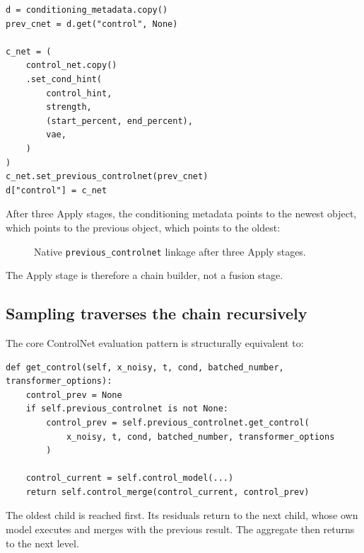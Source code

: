 \documentclass[11pt]{article}
\newcommand{\code}[1]{\texttt{#1}}
\begin{document}
\begin{lstlisting}[style=pythonstyle,caption={Native-style chain construction preserved by JLC Apply.}]
d = conditioning_metadata.copy()
prev_cnet = d.get("control", None)

c_net = (
    control_net.copy()
    .set_cond_hint(
        control_hint,
        strength,
        (start_percent, end_percent),
        vae,
    )
)
c_net.set_previous_controlnet(prev_cnet)
d["control"] = c_net
\end{lstlisting}

After three Apply stages, the conditioning metadata points to the newest object, which points to the previous object, which points to the oldest:

\begin{figure}[H]
\centering
{}
\caption{Native \code{previous\_controlnet} linkage after three Apply stages.}
\end{figure}

The Apply stage is therefore a chain builder, not a fusion stage.

\subsection{Sampling traverses the chain recursively}

The core ControlNet evaluation pattern is structurally equivalent to:

\begin{lstlisting}[style=pythonstyle,caption={Simplified native recursive evaluation.}]
def get_control(self, x_noisy, t, cond, batched_number, transformer_options):
    control_prev = None
    if self.previous_controlnet is not None:
        control_prev = self.previous_controlnet.get_control(
            x_noisy, t, cond, batched_number, transformer_options
        )

    control_current = self.control_model(...)
    return self.control_merge(control_current, control_prev)
\end{lstlisting}

The oldest child is reached first. Its residuals return to the next child, whose own model executes and merges with the previous result. The aggregate then returns to the next level.
\end{document}
